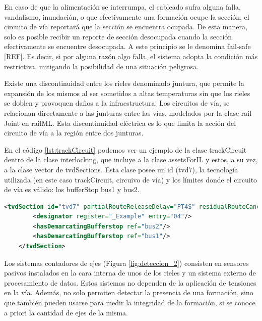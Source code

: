     En caso de que la alimentación se interrumpa, el cableado sufra alguna falla, vandalismo, inundación, o que efectivamente una formación ocupe la sección, el circuito de vía reportará que la sección se encuentra ocupada. De esta manera, solo es posible recibir un reporte de sección desocupada cuando la sección efectivamente se encuentre desocupada. A este principio se le denomina fail-safe [REF]. Es decir, si por alguna razón algo falla, el sistema adopta la condición más restrictiva, mitigando la posibilidad de una situación peligrosa. 
    
    Existe una discontinuidad entre los rieles denominado juntura, que permite la expansión de los mismos al ser sometidos a altas temperaturas sin que los rieles se doblen y provoquen daños a la infraestructura. Los circuitos de vía, se relacionan directamente a las junturas entre las vías, modelados por la clase rail Joint en railML.  Esta discontinuidad eléctrica es lo que limita la acción del circuito de vía a la región entre dos junturas.

    En el código \ref{lst:trackCircuit} podemos ver un ejemplo de la clase trackCircuit dentro de la clase interlocking, que incluye a la clase assetsForIL y estos, a su vez, a la clase vector de tvdSections. Esta clase posee un id (tvd7), la tecnología utilizada (en este caso trackCircuit, circuivo de vía) y los límites donde el circuito de vía es válido: los bufferStop bus1 y bus2.

    \begin{lstlisting}[language = XML, caption = Clase trackCircuit , label = {lst:trackCircuit}]
    <tvdSection id="tvd7" partialRouteReleaseDelay="PT4S" residualRouteCancellationDelay="PT90S" technology="trackCircuit" isBerthingTrack="false">
        <designator register="_Example" entry="04"/>
        <hasDemarcatingBufferstop ref="bus2"/>
        <hasDemarcatingBufferstop ref="bus1"/>
    </tvdSection>
    \end{lstlisting}

    Los sistemas contadores de ejes (Figura \ref{fig:deteccion_2}) consisten en sensores pasivos instalados en la cara interna de unos de los rieles y un sistema externo de procesamiento de datos. Estos sistemas no dependen de la aplicación de tensiones en la vía. Además, no solo permiten detectar la presencia de una formación, sino que también pueden usarse para medir la integridad de la formación, si se conoce a priori la cantidad de ejes de la misma. 

